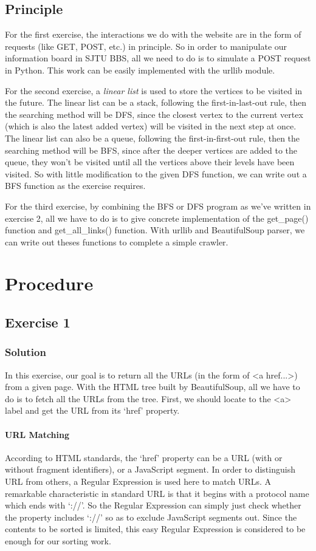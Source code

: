 \documentclass{article}
\begin{document}
\subsection{Principle}

For the first exercise, the interactions we do with the website are in the form of requests (like GET, POST, etc.) in principle. So in order to manipulate our information board in SJTU BBS, all we need to do is to simulate a POST request in Python. This work can be easily implemented with the urllib module.

For the second exercise, a \textit{linear list} is used to store the vertices to be visited in the future. The linear list can be a stack, following the first-in-last-out rule, then the searching method will be DFS, since the closest vertex to the current vertex (which is also the latest added vertex) will be visited in the next step at once. The linear list can also be a queue, following the first-in-first-out rule, then the searching method will be BFS, since after the deeper vertices are added to the queue, they won't be visited until all the vertices above their levels have been visited. So with little modification to the given DFS function, we can write out a BFS function as the exercise requires.

For the third exercise, by combining the BFS or DFS program as we've written in exercise 2, all we have to do is to give concrete implementation of the get\_page() function and get\_all\_links() function. With urllib and BeautifulSoup parser, we can write out theses functions to complete a simple crawler.


\section{Procedure}
\subsection{Exercise 1}

\subsubsection{Solution}
In this exercise, our goal is to return all the URLs (in the form of <a href...>) from a given page. With the HTML tree built by BeautifulSoup, all we have to do is to fetch all the URLs from the tree. First, we should locate to the <a> label and get the URL from its `href' property.

\paragraph{URL Matching} According to HTML standards, the `href' property can be a URL (with or without fragment identifiers), or a JavaScript segment. In order to distinguish URL from others, a Regular Expression is used here to match URLs. A remarkable characteristic in standard URL is that it begins with a protocol name which ends with `://'. So the Regular Expression can simply just check whether the property includes `://'   so as to exclude JavaScript segments out. Since the contents to be sorted is limited, this easy Regular Expression is considered to be enough for our sorting work.
\end{document}
